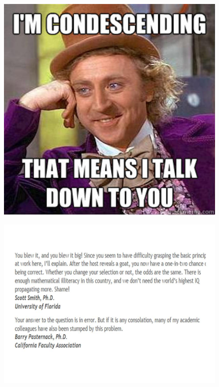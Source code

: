 \documentclass{beamer}
\begin{document}
\begin{frame}
	\begin{figure}
		\centering
		\includegraphics[width=0.7\linewidth]{MontyHall/687}
	\end{figure}
	
\end{frame}
\begin{frame}
	\begin{figure}
		\centering
		\includegraphics[width=1.1\linewidth]{MontyHall/Slide9}

	\end{figure}
	
\end{frame}
\end{document}
